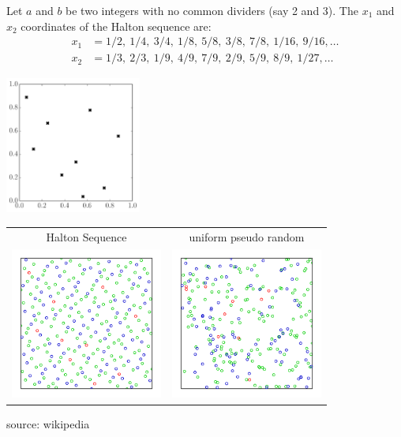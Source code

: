\documentclass{beamer}
\begin{document}
\begin{frame}{}
\begin{example}
	Let $a$ and $b$ be two integers with no common dividers (say 2 and 3). The $x_1$ and $x_2$ coordinates of the Halton sequence are:
	\begin{equation*}
		\begin{split}
			x_1 &= 1/2,\ 1/4,\ 3/4,\ 1/8,\ 5/8,\ 3/8,\ 7/8,\ 1/16,\ 9/16, \dots\\
			x_2 &= 1/3,\ 2/3,\ 1/9,\ 4/9,\ 7/9,\ 2/9,\ 5/9,\ 8/9,\ 1/27, \dots
		\end{split}
	\end{equation*}
\begin{center}
\includegraphics[height=4.5cm]{figures/python/spf_halton}
\end{center}

\end{example}
\end{frame}

\begin{frame}{}
\begin{example}
\begin{center}
  \begin{tabular}{cc}
Halton Sequence & uniform pseudo random \\
\includegraphics[height=5cm]{figures/Halton} & \includegraphics[height=5cm]{figures/random}
  \end{tabular}
 source: wikipedia 
\end{center}
\end{example}
\end{frame}
\end{document}
